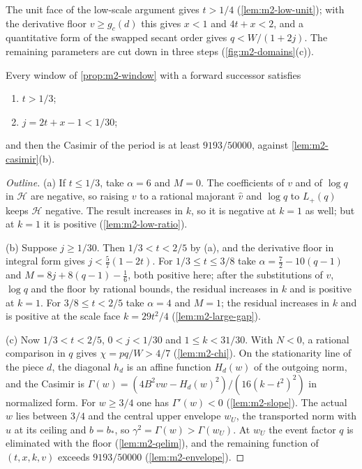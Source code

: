 The unit face of the low-scale argument gives $t>1/4$ (\cref{lem:m2-low-unit}); with the
derivative floor $v\ge g_c(d)$ this gives $x<1$ and $4t+x<2$, and a quantitative form of the swapped
secant order gives $q<W/(1+2j)$. The remaining parameters are cut down in
three steps (\cref{fig:m2-domains}(c)).

\begin{proposition}\label{prop:m2-forward-steps}
Every window of \cref{prop:m2-window} with a forward successor satisfies
\begin{enumerate}[label=(\alph*)]
\item $t>1/3$;
\item $j=2t+x-1<1/30$;
\end{enumerate}
and then the Casimir of the period is at least $9193/50000$, against \cref{lem:m2-casimir}(b).
\end{proposition}

\begin{proof}[Outline]
(a) If $t\le1/3$, take $\alpha=6$ and $M=0$. The coefficients of $v$ and of $\log q$ in $\mathcal H$
are negative, so raising $v$ to a rational majorant $\hat v$ and $\log q$ to $L_+(q)$ keeps
$\mathcal H$ negative. The result increases in $k$, so it is negative at $k=1$ as well; but at
$k=1$ it is positive (\cref{lem:m2-low-ratio}).

(b) Suppose $j\ge1/30$. Then $1/3<t<2/5$ by (a), and the derivative floor in integral form gives
$j<\frac57(1-2t)$. For $1/3\le t\le3/8$ take $\alpha=\frac72-10(q-1)$ and $M=8j+8(q-1)-\frac16$,
both positive here; after the substitutions of $v$, $\log q$ and the floor by rational bounds, the
residual increases in $k$ and is positive at $k=1$. For $3/8\le t<2/5$ take $\alpha=4$ and $M=1$;
the residual increases in $k$ and is positive at the scale face $k=29t^2/4$
(\cref{lem:m2-large-gap}).

(c) Now $1/3<t<2/5$, $0<j<1/30$ and $1\le k<31/30$. With $N<0$, a rational comparison in $q$ gives
$\chi=pq/W>4/7$ (\cref{lem:m2-chi}). On the stationarity line of the piece $d$, the diagonal $h_d$
is an affine function $H_d(w)$ of the outgoing norm, and the Casimir is
$\Gamma(w)=(4B^2vw-H_d(w)^2)/(16(k-t^2)^2)$ in normalized form. For
$w\ge3/4$ one has $\Gamma'(w)<0$ (\cref{lem:m2-slope}). The actual $w$ lies between $3/4$ and the
central upper envelope $w_U$, the transported norm with $u$ at its ceiling and $b=b_*$, so $\gamma^2=\Gamma(w)>\Gamma(w_U)$. At $w_U$ the event factor $q$ is
eliminated with the floor (\cref{lem:m2-qelim}), and the remaining function of $(t,x,k,v)$
exceeds $9193/50000$ (\cref{lem:m2-envelope}).
\end{proof}

